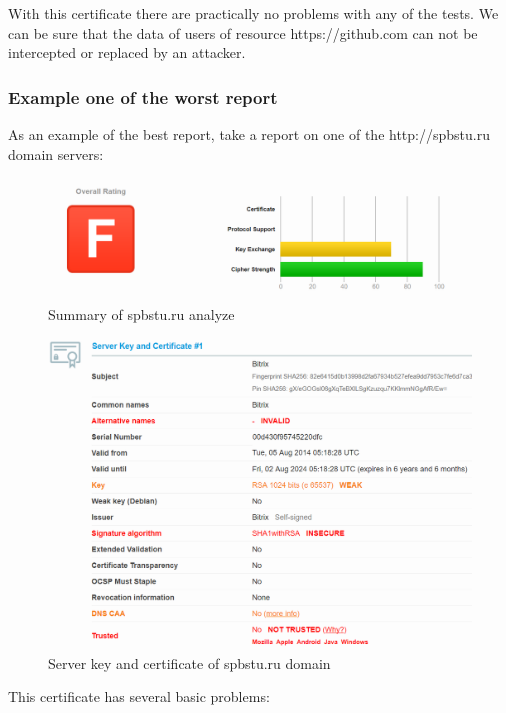 \documentclass[14pt,a4paper,report]{report}
\begin{document}
With this certificate there are practically no problems with any of the tests. We can be sure that the data of users of resource https://github.com can not be intercepted or replaced by an attacker.

\clearpage

\subsubsection{Example one of the worst report}

As an example of the best report, take a report on one of the http://spbstu.ru domain servers:

\begin{figure}[h!]
	\centering
	\includegraphics[scale = 0.50]{images/3.png}
	\caption{Summary of spbstu.ru analyze}
\end{figure}

\begin{figure}[h!]
	\centering
	\includegraphics[scale = 0.61]{images/4.png}
	\caption{Server key and certificate of spbstu.ru domain}
\end{figure}

This certificate has several basic problems:
\end{document}
